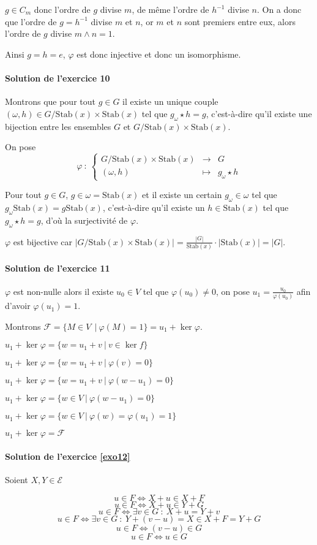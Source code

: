 \documentclass[]{article}
\theoremstyle{remark}
\theoremstyle{definition}
\newcommand{\func}[5]{
#1 ~ : ~ \left\{ \begin{array}{lcl}
	#2 & \longrightarrow & #3 \\
	#4 & \longmapsto & #5
\end{array}
\right.
}
\begin{document}
$g \in C_m$ donc l'ordre de $g$ divise $m$, de même l'ordre de $h^{-1}$ divise $n$. On a donc que l'ordre de $g=h^{-1}$ divise $m$ et $n$, or $m$ et $n$ sont premiers entre eux, alors l'ordre de $g$ divise $m \land n = 1$.

Ainsi $g = h = e$, $\varphi$ est donc injective et donc un isomorphisme.

\paragraph{Solution de l'exercice 10}

Montrons que pour tout $g \in G$ il existe un unique couple $(\omega, h) \in G / \text{Stab}(x) \times \text{Stab}(x)$ tel que $g_\omega \star h = g$, c'est-à-dire qu'il existe une bijection entre les ensembles $G$ et $G/\text{Stab}(x) \times \text{Stab}(x)$.

On pose $$\func{\varphi}{G/\text{Stab}(x) \times \text{Stab}(x)}{G}{(\omega, h)}{g_\omega \star h}$$

Pour tout $g \in G$, $g \in \omega = \text{Stab}(x)$ et il existe un certain $g_\omega \in \omega$ tel que $g_\omega \text{Stab}(x) = g \text{Stab}(x)$, c'est-à-dire qu'il existe un $h \in \text{Stab}(x)$ tel que $g_\omega \star h = g$, d'où la surjectivité de $\varphi$.

$\varphi$ est bijective car $\left|G / \text{Stab}(x) \times \text{Stab}(x)\right| = \frac{|G|}{\text{Stab}(x)} \cdot |\text{Stab}(x)| = |G|$.

\paragraph{Solution de l'exercice 11}

$\varphi$ est non-nulle alors il existe $u_0 \in V$ tel que $\varphi(u_0) \neq 0$, on pose $u_1 = \frac{u_0}{\varphi(u_0)}$ afin d'avoir $\varphi(u_1) = 1$.

Montrons $\mathcal{F} = \{M \in V\ ~ | ~ \varphi(M) = 1\} = u_1 + \ker \varphi$.

$u_1 + \ker \varphi = \{w = u_1 + v ~ | ~ v \in \ker f\}$

$u_1 + \ker \varphi = \{w = u_1 + v ~ | ~  \varphi(v) = 0\}$

$u_1 + \ker \varphi = \{w = u_1 + v ~ | ~ \varphi(w - u_1) = 0\}$

$u_1 + \ker \varphi = \{w \in V ~ | ~ \varphi(w - u_1) = 0\}$

$u_1 + \ker \varphi = \{w \in V ~ | ~ \varphi(w) = \varphi(u_1) = 1\}$

$u_1 + \ker \varphi = \mathcal{F}$

\paragraph{Solution de l'exercice \ref{exo12}}

Soient $X, Y \in \mathcal{E}$

$$u \in F \Longleftrightarrow X + u \in X + F$$
$$u \in F \Longleftrightarrow X + u \in Y + G$$
$$u \in F \Longleftrightarrow \exists v \in G ~ : ~ X + u = Y + v$$
$$u \in F \Longleftrightarrow \exists v \in G ~ : ~ Y + (v - u) = X \in X + F = Y + G$$
$$u \in F \Longleftrightarrow (v - u) \in G$$
$$u\in F \Longleftrightarrow u \in G$$
\end{document}
